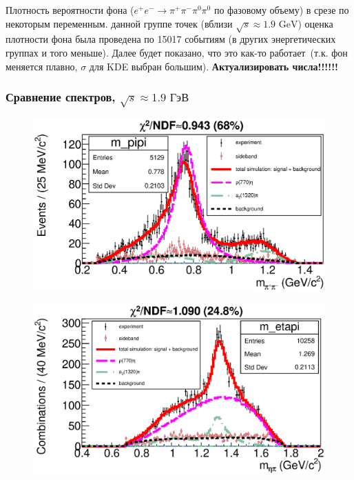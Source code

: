 \documentclass{beamer}
\begin{document}
\begin{frame}
\begin{center}
\begin{minipage}[t]{0.4\linewidth}
\begin{figure}
      \end{figure}
    \end{minipage}
  \end{center}
  \scriptsize
  Плотность вероятности фона ($e^+e^-\rightarrow\pi^+\pi^-\pi^0\pi^0$ по фазовому объему) в срезе по
  некоторым переменным.  данной группе точек (вблизи $\sqrt{s}\approx 1.9\text{ GeV}$)
  оценка плотности фона была проведена по 15017 событиям (в других
  энергетических группах и того меньше). Далее будет показано, что это как-то
  работает~(т.к. фон меняется плавно, $\sigma$ для KDE выбран большим).
  \textbf{Актуализировать числа!!!!!!}
\end{frame}


\begin{frame}
  \frametitle{Сравнение спектров, $\sqrt{s}\approx{1.9}\text{ ГэВ}$}
  \begin{minipage}[t]{0.48\linewidth}
    \begin{figure}
      \includegraphics[width=\linewidth]{figures/m_pipi_g950.eps}
    \end{figure}
  \end{minipage}
  \begin{minipage}[t]{0.48\linewidth}
    \begin{figure}
      \includegraphics[width=\linewidth]{figures/m_etapi_g950.eps}

\end{figure}
\end{minipage}
\end{frame}
\end{document}
